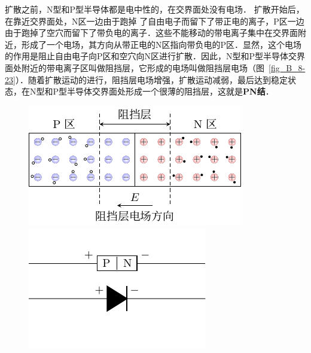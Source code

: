 扩散之前，N型和P型半导体都是电中性的，在交界面处没有电场．
扩散开始后，在靠近交界面处，N区一边由于跑掉
了自由电子而留下了带正电的离子，P区一边由于跑掉了空穴而留下了带负电的离子．这些不能移动的带电离子集中在交界面附近，形成了一个电场，其方向从带正电的N区指向带负电的P区．显然，这个电场的作用是阻止自由电子向P区和空穴向N区进行扩散．因此，N型和P型半导体交界面处附近的带电离子区叫做阻挡层，它形成的电场叫做阻挡层电场（图~\ref{fig_B_8-23}）．随着扩散运动的进行，阻挡层电场增强，扩散运动减弱，最后达到稳定状态，在N型和P型半导体交界面处形成一个很薄的阻挡层，这就是\textbf{PN结}．
\begin{figure}[htbp]
    \centering
    \begin{minipage}[t]{0.48\linewidth}
    	\centering
    	\includegraphics{fig/B/8-23.pdf}
    	\caption{}\label{fig_B_8-23}
    \end{minipage}
    \begin{minipage}[t]{0.48\linewidth}
    	\centering
    	\includegraphics{fig/B/8-24.pdf}
    	\caption{}\label{fig_B_8-24}
	\end{minipage}
\end{figure}


